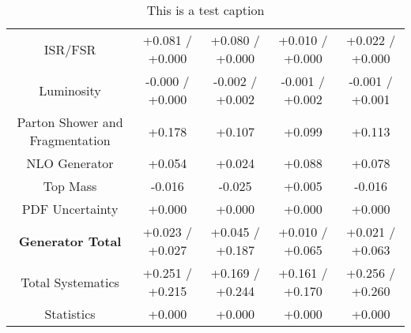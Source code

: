 \begin{table}[htbp]
\begin{center}
\begin{tabular}{|c|c|c|c|c|}
ISR/FSR                               &+0.081   / +0.000   & +0.080   / +0.000   & +0.010   / +0.000   & +0.022   / +0.000  \\
Luminosity                            &-0.000   / +0.000   & -0.002   / +0.002   & -0.001   / +0.002   & -0.001   / +0.001  \\
Parton Shower and Fragmentation       &+0.178              & +0.107              & +0.099              & +0.113             \\
NLO Generator                         &+0.054              & +0.024              & +0.088              & +0.078             \\
Top Mass                              &-0.016              & -0.025              & +0.005              & -0.016             \\
PDF Uncertainty                       &+0.000              & +0.000              & +0.000              & +0.000             \\
\hline
\textbf{Generator Total}              &+0.023   / +0.027   & +0.045   / +0.187   & +0.010   / +0.065   & +0.021   / +0.063  \\
\hline
\hline
Total Systematics                     &+0.251   / +0.215   & +0.169   / +0.244   & +0.161   / +0.170   & +0.256   / +0.260  \\
Statistics                            &+0.000              & +0.000              & +0.000              & +0.000             \\
\hline
  \end{tabular}
  \end{center} 
  \label{tab:fsm_nominal_sratio_low}
  \caption{This is a test caption}
\end{table}


